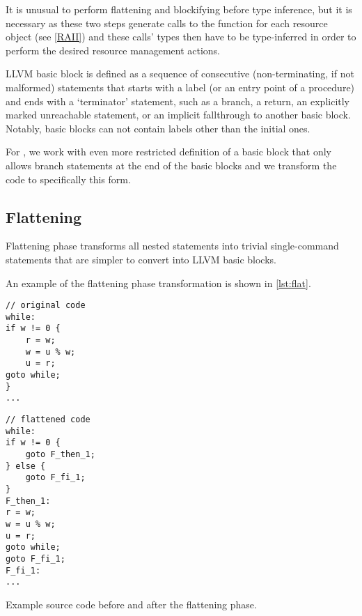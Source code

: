 \begin{remark}
    It is unusual to perform flattening and blockifying before type inference, but it is necessary as these two steps generate calls to the  function for each resource object (see \cref{RAII}) and these calls' types then have to be type-inferred in order to perform the desired resource management actions.
\end{remark}

LLVM basic block is defined as a sequence of consecutive (non-terminating, if not malformed) statements that starts with a label (or an entry point of a procedure) and ends with a `terminator' statement, such as a branch, a return, an explicitly marked unreachable statement, or an implicit fallthrough to another basic block. Notably, basic blocks can not contain labels other than the initial ones.

For \cmm{}, we work with even more restricted definition of a basic block that only allows branch statements at the end of the basic blocks and we transform the code to specifically this form.

\subsection{Flattening}

Flattening phase transforms all nested statements into trivial single-command statements that are simpler to convert into LLVM basic blocks.

An example of the flattening phase transformation is shown in \cref{lst:flat}.

\begin{listing}
\begin{center}
\begin{minipage}{0.5\linewidth}
\begin{lstlisting}
// original code
while:
if w != 0 {
    r = w;
    w = u % w;
    u = r;
goto while;
}
...\end{lstlisting}
\end{minipage}%
\begin{minipage}{0.5\linewidth}
\begin{lstlisting}
// flattened code
while:
if w != 0 {
    goto F_then_1;
} else {
    goto F_fi_1;
}
F_then_1:
r = w;
w = u % w;
u = r;
goto while;
goto F_fi_1;
F_fi_1:
...\end{lstlisting}
\end{minipage}
\end{center}
\caption{Example source code before and after the flattening phase.}
\label{lst:flat}
\end{listing}

